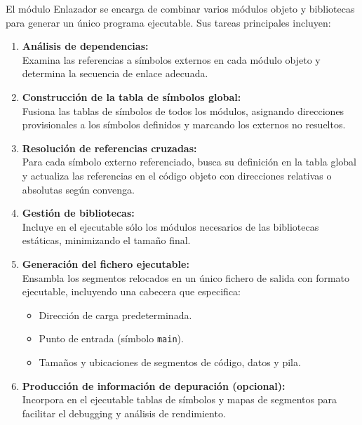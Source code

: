 \documentclass{article}
\begin{document}
El módulo Enlazador se encarga de combinar varios módulos objeto y bibliotecas para generar un único programa ejecutable. Sus tareas principales incluyen:

\begin{enumerate}
  \item \textbf{Análisis de dependencias:}\\
        Examina las referencias a símbolos externos en cada módulo objeto y determina la secuencia de enlace adecuada.

  \item \textbf{Construcción de la tabla de símbolos global:}\\
        Fusiona las tablas de símbolos de todos los módulos, asignando direcciones provisionales a los símbolos definidos y marcando los externos no resueltos.

  \item \textbf{Resolución de referencias cruzadas:}\\
        Para cada símbolo externo referenciado, busca su definición en la tabla global y actualiza las referencias en el código objeto con direcciones relativas o absolutas según convenga.

  \item \textbf{Gestión de bibliotecas:}\\
        Incluye en el ejecutable sólo los módulos necesarios de las bibliotecas estáticas, minimizando el tamaño final.

  \item \textbf{Generación del fichero ejecutable:}\\
        Ensambla los segmentos relocados en un único fichero de salida con formato ejecutable, incluyendo una cabecera que especifica:
        \begin{itemize}
          \item Dirección de carga predeterminada.
          \item Punto de entrada (símbolo \texttt{main}).
          \item Tamaños y ubicaciones de segmentos de código, datos y pila.
        \end{itemize}

  \item \textbf{Producción de información de depuración (opcional):}\\
        Incorpora en el ejecutable tablas de símbolos y mapas de segmentos para facilitar el debugging y análisis de rendimiento.
\end{enumerate}
\end{document}
